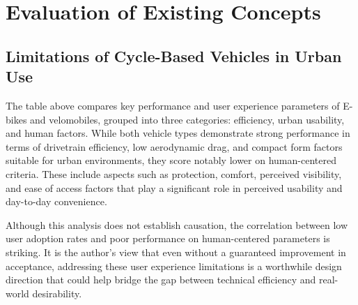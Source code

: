 \section{Evaluation of Existing Concepts}

\subsection{Limitations of Cycle-Based Vehicles in Urban Use}
The table above compares key performance and user experience parameters of E-bikes and velomobiles, grouped into three categories: efficiency, urban usability, and human factors. While both vehicle types demonstrate strong performance in terms of drivetrain efficiency, low aerodynamic drag, and compact form factors suitable for urban environments, they score notably lower on human-centered criteria. These include aspects such as protection, comfort, perceived visibility, and ease of access factors that play a significant role in perceived usability and day-to-day convenience.

Although this analysis does not establish causation, the correlation between low user adoption rates and poor performance on human-centered parameters is striking. It is the author's view that even without a guaranteed improvement in acceptance, addressing these user experience limitations is a worthwhile design direction that could help bridge the gap between technical efficiency and real-world desirability.

